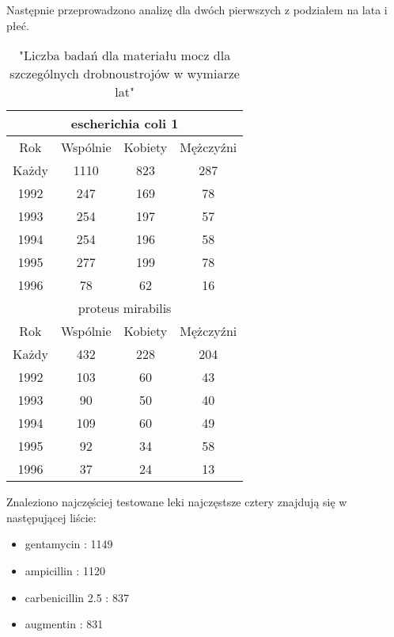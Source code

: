 \documentclass[a4paper,11pt]{article}
\begin{document}
Następnie przeprowadzono analizę dla dwóch pierwszych z podziałem na lata i płeć.

\begin{table}[h]
  \begin{center}
  \caption{"Liczba badań dla materiału mocz dla szczególnych drobnoustrojów w wymiarze lat"}
  \begin{tabular}{|c|c|c|c|}
    \hline
    \multicolumn{4}{|c|}{escherichia coli 1} \\ 
    \hline Rok &Wspólnie & Kobiety & Mężczyźni \\ \hline
    Każdy& 1110& 823& 287 \\ \hline 
    1992& 247& 169& 78 \\ \hline
    1993& 254& 197& 57 \\ \hline
    1994& 254& 196& 58 \\ \hline
    1995& 277& 199& 78 \\ \hline
    1996& 78& 62& 16 \\ \hline

    \multicolumn{4}{|c|}{proteus mirabilis} \\ \hline
    Rok &Wspólnie & Kobiety & Mężczyźni \\ \hline
    Każdy& 432& 228& 204 \\ \hline 
    1992& 103& 60& 43 \\ \hline
    1993& 90& 50& 40 \\ \hline
    1994& 109& 60& 49 \\ \hline
    1995& 92& 34& 58 \\ \hline
    1996& 37& 24& 13 \\ \hline
  \end{tabular}
\end{center}
\end{table}

Znaleziono najczęściej testowane leki najczęstsze cztery znajdują się w następującej liście:
\begin{itemize}
  \item gentamycin : 1149
  \item ampicillin : 1120
  \item carbenicillin 2.5 : 837
  \item augmentin : 831
\end{itemize}
\end{document}
